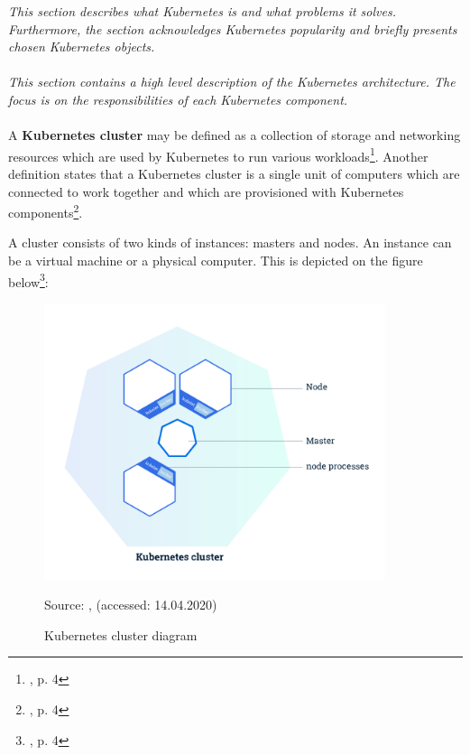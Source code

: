 \textit{This section describes what Kubernetes is and what problems it solves. Furthermore, the section acknowledges Kubernetes popularity and briefly presents chosen Kubernetes objects.}
~\\
~\\
\textit{This section contains a high level description of the Kubernetes architecture. The focus is on the responsibilities of each Kubernetes component.}
~\\
~\\
A \textbf{Kubernetes cluster} may be defined as a collection of storage and networking resources which are used by Kubernetes to run various workloads\footnote{\cite{book-mastering-k8s}, p. 4}. Another definition states that a Kubernetes cluster is a single unit of computers which are connected to work together and which are provisioned with Kubernetes components\footnote{\cite{k8s-cluster}, p. 4}.

A cluster consists of two kinds of instances: masters and nodes. An instance can be a virtual machine or a physical computer. This is depicted on the figure below\footnote{\cite{k8s-cluster}, p. 4}:
\begin{figure}[H]
    \centering
    \includegraphics[width=10cm]{figures/cluster.png}
    \label{fig:cluster}
    \caption{Kubernetes cluster diagram}
    \small{Source: \cite{k8s-cluster}, (accessed: 14.04.2020)}
\end{figure}

